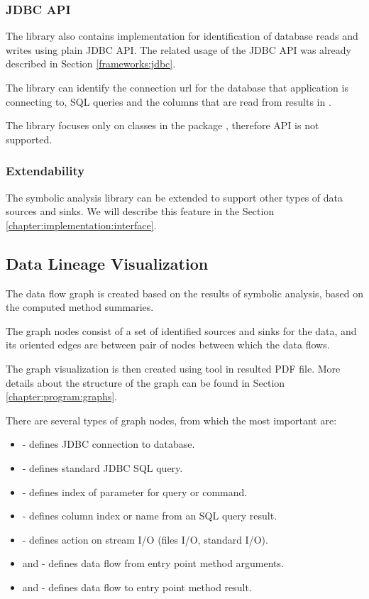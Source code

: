 \subsubsection{JDBC API}

The library also contains implementation for identification of
database reads and writes using plain JDBC API.
The related usage of the JDBC API was already described in Section \ref{frameworks:jdbc}.

The library can identify the connection url for the database
that application is connecting to, SQL queries and the columns
that are read from results in .

The library focuses only on classes in the package , therefore\break
{} API is not supported.



\subsubsection{Extendability}

The symbolic analysis library can be extended to support other types
of data sources and sinks. We will describe this feature in the Section \ref{chapter:implementation:interface}.



\subsection{Data Lineage Visualization \label{chapter:analysis:visualization}}

The data flow graph is created based on the results of symbolic analysis, based on
the computed method summaries.

The graph nodes consist of a set of identified sources and sinks for the data,
and its oriented edges are between pair of nodes between which the data flows.

The graph visualization is then created using \citet{Graphviz} tool in resulted PDF file.
More details about the structure of the graph can be found in Section \ref{chapter:program:graphs}.

There are several types of graph nodes, from which the most important are:
\begin{itemize}
  \item {} - defines JDBC connection to database.
  \item {} - defines standard JDBC SQL query.
  \item {} - defines index of parameter for query or command.
  \item {} - defines column index or name from an SQL query result.
  \item {} - defines action on stream I/O (files I/O, standard I/O).
  \item {} and  - defines data flow from entry point method arguments.
  \item {} and  - defines data flow to entry point method result.
\end{itemize}

